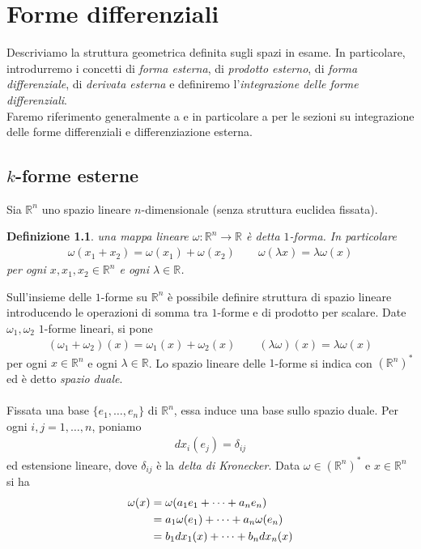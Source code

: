 \documentclass[twoside, 11pt]{amsbook}
\newcommand{\0}{{(0)}}
\newcommand{\3}{{(3)}}
\theoremstyle{colonplain}
\theoremstyle{colondefinition}
\newtheorem{defn}[thm]{Definizione}
\theoremstyle{colonremark}
\numberwithin{equation}{chapter}
\begin{document}
\chapter{Forme differenziali}
Descriviamo la struttura geometrica definita sugli spazi in esame. In particolare, introdurremo i concetti di \textit{forma esterna}, di \textit{prodotto esterno}, di \textit{forma differenziale}, di \textit{derivata esterna} e definiremo l'\textit{integrazione delle forme differenziali}. \\
Faremo riferimento generalmente a \cite{Arnold} e in particolare a \cite{Lee} per le sezioni su integrazione delle forme differenziali e differenziazione esterna.
\section{\texorpdfstring{$k$-forme esterne}{Pk-forme esterne}}
Sia $\mathbb{R}^n$ uno spazio lineare $n$-dimensionale (senza struttura euclidea fissata).
\begin{defn} una mappa lineare $\omega : \mathbb{R}^n \longrightarrow \mathbb{R}$ è detta $1$-\textit{forma}. In particolare 
\begin{align}
    \omega(x_1 + x_2) = \omega(x_1) + \omega(x_2) \qquad \omega(\lambda x) = \lambda\omega(x) 
\end{align}
per ogni $x, x_1, x_2 \in \mathbb{R}^n$ e ogni $\lambda \in \mathbb{R}$.
\end{defn}
Sull'insieme delle $1$-forme su $\mathbb{R}^n$ è possibile definire struttura di spazio lineare introducendo le operazioni di somma tra $1$-forme e di prodotto per scalare. Date $\omega_1, \omega_2$ $1$-forme lineari, si pone 
\begin{align}
    (\omega_1 + \omega_2)(x) = \omega_1(x) + \omega_2(x) \qquad (\lambda\omega)(x) = \lambda\omega(x) 
\end{align}
per ogni $x \in \mathbb{R}^n$ e ogni $\lambda \in \mathbb{R}$. Lo spazio lineare delle $1$-forme si indica con $(\mathbb{R}^n)^*$ ed è detto \textit{spazio duale}. \\ \\
Fissata una base $\{e_1, \dots, e_n\}$ di $\mathbb{R}^n$, essa induce una base sullo spazio duale. Per ogni $i, j = 1, \dots, n$, poniamo
\begin{align}
    dx_i(e_j) = \delta_{ij} 
\end{align}
ed estensione lineare, dove $\delta_{ij}$ è la \textit{delta di Kronecker}. Data $\omega \in (\mathbb{R}^n)^*$ e $x \in \mathbb{R}^n$ si ha 
\begin{align}
    \omega(x) &= \omega(a_1e_1 + \dots + a_ne_n) \notag \\
    &= a_1\omega(e_1) + \dots + a_n\omega(e_n) \notag \\
    &= b_1dx_1(x) + \dots + b_ndx_n(x) \notag
\end{align}
\end{document}
